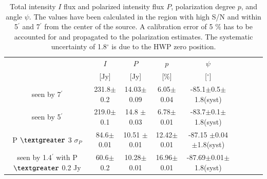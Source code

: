 \documentclass[twocolumn,traditabstract]{aa}
\begin{document}
\begin{table}
  \centering
      \begin{tabular}{ccccccccc}
      \hline
      \hline
       & $I$ & $P$ & $p$ & $\psi$  \\ 
                                         & [Jy]         &    [Jy]         & [\%]  & [$^\circ$] \\
      \hline
      \hline
 seen by 7$^{\prime}$   & 231.8$\pm$0.2  & 14.03$\pm$0.09 & 6.05$\pm$0.04 & -85.1$\pm$0.5$\pm$1.8(syst)  \\ 
    
            seen by 5$^{\prime}$ & 219.0$\pm$0.1  & 14.8 $\pm$0.03 & 6.78$\pm$0.01 & -83.7$\pm$0.1$\pm$1.8(syst)    \\ 
      P $\textgreater$ 3 $\sigma_P$     & 84.6$\pm$0.01  & 10.51 $\pm$0.01 &12.42$\pm$0.01 & -87.15 $\pm$0.04$\pm$1.8(syst) \\
     	      
              seen by 1.4$^{\prime}$ with P $\textgreater$ 0.2 Jy& 60.6$\pm$0.2 & 10.28$\pm$0.01  & 16.96$\pm$0.01 &-87.69$\pm$0.01$\pm$1.8(syst)\\
              
             
                \hline            
    \hline   
    \end{tabular}
   \caption{ Total intensity $I$ flux and  polarized intensity flux $P$, polarization degree $p$, and angle $\psi$. The values have been calculated in the region with high S/N and within 5$^{\prime}$ and 7$^{\prime}$ from the center of the source. A calibration error of 5 $\%$ has to be accounted for and propagated to the polarization estimates. The systematic uncertainty of 1.8$^{\circ}$ is due to the HWP zero position.}
    \label{tab:crab_results}
 \end{table}
  
\end{document}
